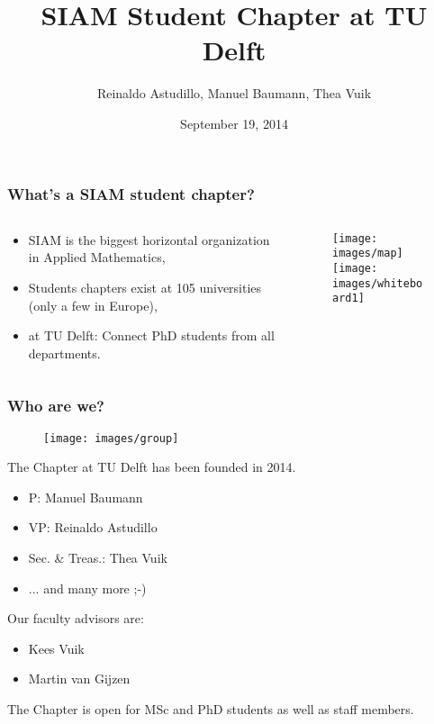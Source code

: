 \documentclass{beamer}
\title{\huge{SIAM Student Chapter at TU Delft}}
\author{Reinaldo Astudillo, Manuel Baumann, Thea Vuik}
\date{\footnotesize{September 19, 2014}}
\begin{document}
\frame{\titlepage}
\begin{frame}
\frametitle{What's a SIAM student chapter?}
\begin{columns}
 \begin{column}{0.7\textwidth}
 \begin{itemize}
  \item SIAM is the biggest horizontal organization in Applied Mathematics,
  \item Students chapters exist at 105 universities (only a few in Europe),
  \item at TU Delft: Connect PhD students from all departments.
 \end{itemize}

 \end{column}

 \begin{column}{0.4\textwidth}
  \begin{figure}[t]
  \centering
  \texttt{[image: images/map]} \vspace{0.6cm}\\
  \texttt{[image: images/whiteboard1]}
  \end{figure}
 \end{column}
 \end{columns}
\end{frame}

\begin{frame}
\frametitle{Who are we?}
\begin{figure}
 \texttt{[image: images/group]}
\end{figure}
\end{frame}

\begin{frame}
   The Chapter at TU Delft has been {\color{blue}founded in 2014}.
  \vspace{-0.3cm}
  \begin{itemize}
    \item {\color{blue}P:} Manuel Baumann
    \item {\color{blue}VP:} Reinaldo Astudillo
    \item {\color{blue}Sec. \& Treas.:} Thea Vuik
    \item ... and many more ;-)
  \end{itemize}

  Our faculty advisors are:
  \vspace{-0.3cm}
  \begin{itemize}
    \item Kees Vuik
    \item Martin van Gijzen
  \end{itemize}
  \pause
  The Chapter is {\color{blue}open} for MSc and PhD students as well as staff members.
\end{frame}
\end{document}
